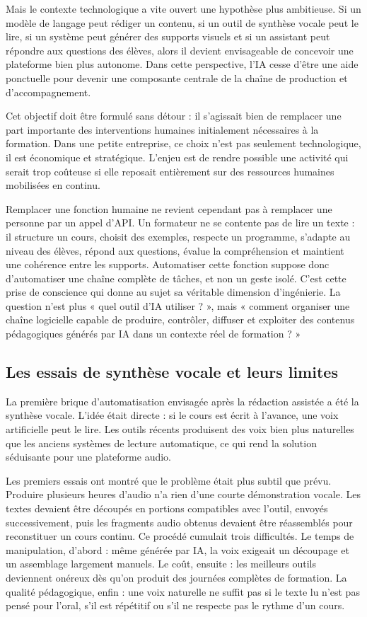 \documentclass[12pt,a4paper]{article}
\begin{document}
Mais le contexte technologique a vite ouvert une hypothèse plus ambitieuse. Si un modèle
de langage peut rédiger un contenu, si un outil de synthèse vocale peut le lire, si un
système peut générer des supports visuels et si un assistant peut répondre aux questions
des élèves, alors il devient envisageable de concevoir une plateforme bien plus autonome.
Dans cette perspective, l'IA cesse d'être une aide ponctuelle pour devenir une composante
centrale de la chaîne de production et d'accompagnement.

Cet objectif doit être formulé sans détour : il s'agissait bien de remplacer une part
importante des interventions humaines initialement nécessaires à la formation. Dans une
petite entreprise, ce choix n'est pas seulement technologique, il est économique et
stratégique. L'enjeu est de rendre possible une activité qui serait trop coûteuse si elle
reposait entièrement sur des ressources humaines mobilisées en continu.

Remplacer une fonction humaine ne revient cependant pas à remplacer une personne par
un appel d'API. Un formateur ne se contente pas de lire un texte : il structure un cours,
choisit des exemples, respecte un programme, s'adapte au niveau des élèves, répond aux
questions, évalue la compréhension et maintient une cohérence entre les supports.
Automatiser cette fonction suppose donc d'automatiser une chaîne complète de tâches, et
non un geste isolé. C'est cette prise de conscience qui donne au sujet sa véritable
dimension d'ingénierie. La question n'est plus « quel outil d'IA utiliser ? », mais «
comment organiser une chaîne logicielle capable de produire, contrôler, diffuser et
exploiter des contenus pédagogiques générés par IA dans un contexte réel de formation ? »

\subsection{Les essais de synthèse vocale et leurs limites}

La première brique d'automatisation envisagée après la rédaction assistée a été la synthèse
vocale. L'idée était directe : si le cours est écrit à l'avance, une voix artificielle peut le
lire. Les outils récents produisent des voix bien plus naturelles que les anciens systèmes
de lecture automatique, ce qui rend la solution séduisante pour une plateforme audio.

Les premiers essais ont montré que le problème était plus subtil que prévu. Produire
plusieurs heures d'audio n'a rien d'une courte démonstration vocale. Les textes devaient
être découpés en portions compatibles avec l'outil, envoyés successivement, puis les
fragments audio obtenus devaient être réassemblés pour reconstituer un cours continu. Ce
procédé cumulait trois difficultés. Le temps de manipulation, d'abord : même générée par
IA, la voix exigeait un découpage et un assemblage largement manuels. Le coût, ensuite :
les meilleurs outils deviennent onéreux dès qu'on produit des journées complètes de
formation. La qualité pédagogique, enfin : une voix naturelle ne suffit pas si le texte lu
n'est pas pensé pour l'oral, s'il est répétitif ou s'il ne respecte pas le rythme d'un cours.
\end{document}

